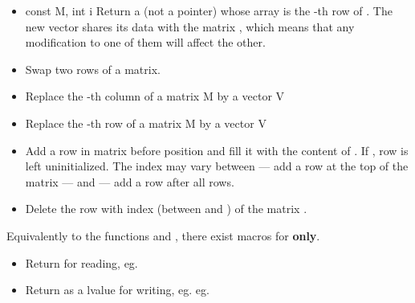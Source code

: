 \begin{itemize}
\item {}
  {const  \ptr M, int i}
  \sshortdescribe Return a  (not a pointer) whose array is
  the -th row of . The new vector shares its data with the
  matrix , which means that any modification to one of them will affect
  the other.
  
\item {}
  \sshortdescribe Swap two rows of a matrix.  

\item {}
  \sshortdescribe Replace the -th column of a matrix M by a vector V 

\item {}
  \sshortdescribe Replace the -th row of a matrix M by a vector V  

\item {}
  \sshortdescribe Add a row in matrix  before position  and fill
  it with the content of . If , row  is left
  uninitialized. The index  may vary between  --- add a row at the
  top of the matrix --- and  --- add a row after all rows.

\item {}
  \sshortdescribe Delete the row with index  (between  and
  ) of the matrix .

\end{itemize}

Equivalently to the functions  and ,
there exist macros for {\bf {} only}.
\begin{itemize}
\item {}
  \sshortdescribe Return  for reading, eg. 
  
\item {}
  \sshortdescribe Return  as a lvalue for writing, eg. eg. 
\end{itemize}


